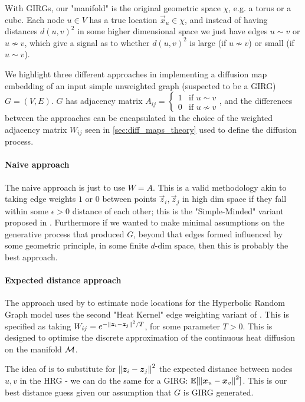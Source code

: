 With GIRGs, our "manifold" is the original geometric space $\chi$, e.g. a torus or a cube. Each node $u \in V$ has a true location $\vec{x}_u \in \chi$, and instead of having distances $d(u, v)^2$ in some higher dimensional space we just have edges $u \sim v$ or $u \nsim v$, which give a signal as to whether $d(u, v)^2$ is large (if $u \nsim v$) or small (if $u \sim v$).

We highlight three different approaches in implementing a diffusion map embedding of an input simple unweighted graph (suspected to be a GIRG) $G=(V, E)$.
$G$ has adjacency matrix $A_{ij} = \begin{cases} 1 & \text{if } u \sim v \\ 0 & \text{if } u \nsim v \end{cases}$, and the differences between the approaches can be encapsulated in the choice of the weighted adjacency matrix $W_{ij}$ seen in \cref{sec:diff_maps_theory} used to define the diffusion process.

\paragraph{Naive approach}
The naive approach is just to use $W = A$. This is a valid methodology akin to taking edge weights $1$ or $0$ between points $\vec{z}_i, \vec{z}_j$ in high dim space if they fall within some $\epsilon > 0$ distance of each other; this is the "Simple-Minded" variant proposed in \cite{belkin2001laplacian}. Furthermore if we wanted to make minimal assumptions on the generative process that produced $G$, beyond that edges formed influenced by some geometric principle, in some finite $d$-dim space, then this is probably the best approach.

\paragraph{Expected distance approach}
The approach used by \cite{garcia2019mercator} to estimate node locations for the Hyperbolic Random Graph model uses the second "Heat Kernel" edge weighting variant of \cite{belkin2001laplacian}. This is specified as taking $W_{ij} = e^{-\left\lVert \bm{z}_i - \bm{z}_j\right\rVert^2 / T}$, for some parameter $T > 0$. This is designed to optimise the discrete approximation of the continuous heat diffusion on the manifold $\mathcal{M}$.

The idea of \cite{garcia2019mercator} is to substitute for $\left\lVert \bm{z}_i - \bm{z}_j\right\rVert^2$ the expected distance between nodes $u, v$ in the HRG - we can do the same for a GIRG: $\mathbb{E}[\left\lVert \bm{x}_u - \bm{x}_v\right\rVert^2]$. This is our best distance guess given our assumption that $G$ is GIRG generated.

